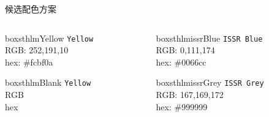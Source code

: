 \documentclass[newPxFont,sthlmFooter]{beamer}
\begin{document}
\begin{frame}[c]{候选配色方案}
\begin{columns}[c]
\begin{column}{0.23\textwidth}

\begin{beamercolorbox}[wd=\linewidth,ht=10ex,dp=3ex]{boxsthlmYellow}
\centering
	\texttt{Yellow}\\
	\vspace{1em}
	\tiny{RGB:  252,191,10} \\
	\tiny{hex: \#fcbf0a}
\end{beamercolorbox}

\vspace{3em}

\begin{beamercolorbox}[wd=\linewidth,ht=10ex,dp=3ex]{boxsthlmBlank}
\centering
	\texttt{Yellow}\\
	\vspace{1em}
	\tiny{RGB} \\
	\tiny{hex}
\end{beamercolorbox}
\end{column}


\begin{column}{0.23\textwidth}
\begin{beamercolorbox}[wd=\linewidth,ht=10ex,dp=3ex]{boxsthlmissrBlue}
\centering
	\texttt{ISSR Blue}\\
	\vspace{1em}
	\tiny{RGB:  0,111,174} \\
	\tiny{hex: \#0066cc}
\end{beamercolorbox}

\vspace{3em}

\begin{beamercolorbox}[wd=\linewidth,ht=10ex,dp=3ex]{boxsthlmissrGrey}
\centering
	\texttt{ISSR Grey}\\
	\vspace{1em}
	\tiny{RGB:  167,169,172} \\
	\tiny{hex: \#999999}
\end{beamercolorbox}
\end{column}
\end{columns}

\end{frame}
\end{document}
